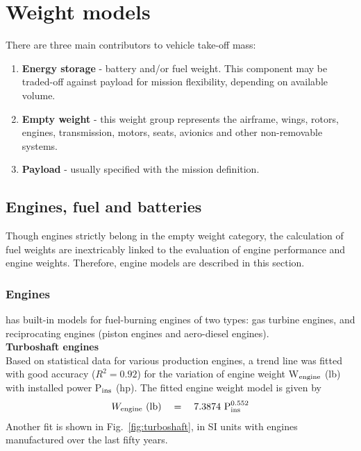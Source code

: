 \section{Weight models}
There are three main contributors to vehicle take-off mass:
\begin{enumerate}
\item {\bf Energy storage} - battery and/or fuel weight. This component may be traded-off against payload for mission flexibility, depending on available volume. 
\item {\bf Empty weight} - this weight group represents the airframe, wings, rotors, engines, transmission, motors, seats, avionics and other non-removable systems.
\item {\bf Payload} - usually specified with the mission definition.
\end{enumerate}

\subsection{Engines, fuel and batteries}
Though engines strictly belong in the empty weight category, the calculation of fuel weights are inextricably linked to the evaluation of engine performance and engine weights. Therefore, engine models are described in this section. 

\subsubsection{Engines}
\hydra \spc has built-in models for fuel-burning engines of two types: gas turbine engines, and reciprocating engines (piston engines and aero-diesel engines). \\
\textbf{Turboshaft engines} \\
Based on statistical data for various production engines, a trend line was fitted with good accuracy ($R^2 = 0.92$) for the variation of engine weight W$_{\rm engine}$ (lb) with installed power P$_{\rm ins}$ (hp). The fitted engine weight model is given by
\begin{equation}
\label{eqn:turbowt}
W_{\rm engine}\textrm{ } (\textrm{lb}) \quad = \quad 7.3874 \textrm{ P}_{\rm ins}^{0.552}
\end{equation}
Another fit is shown in Fig.~\ref{fig:turboshaft}, in SI units with engines manufactured over the last fifty years.

